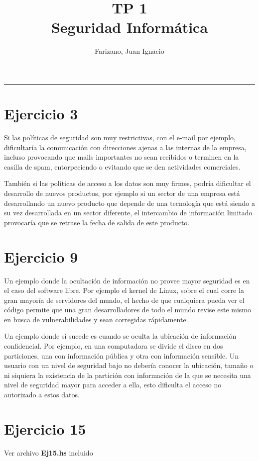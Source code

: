 \documentclass[11pt]{article}
\title{
    TP 1 \\
    \large Seguridad Informática}
\author{Farizano, Juan Ignacio}
\date{}
\begin{document}
\maketitle

\rule{\textwidth}{1pt}

\section*{Ejercicio 3}
Si las políticas de seguridad son muy restrictivas, con el e-mail por ejemplo, dificultaría
la comunicación con direcciones ajenas a las internas de la empresa, incluso provocando
que mails importantes no sean recibidos o terminen en la casilla de spam,
entorpeciendo o evitando que se den actividades comerciales.

También si las politicas de acceso a los datos son muy firmes, podría dificultar
el desarrollo de nuevos productos, por ejemplo si un sector de una empresa está
desarrollando un nuevo producto que depende de una tecnología que está siendo 
a su vez desarrollada en un sector diferente, el intercambio de información limitado
provocaría que se retrase la fecha de salida de este producto.


\section*{Ejercicio 9}
Un ejemplo donde la ocultación de información no provee mayor seguridad es en el 
caso del software libre. Por ejemplo el kernel de Linux, sobre el cual corre la gran
mayoría de servidores del mundo, el hecho de que cualquiera pueda ver el código
permite que una gran desarrolladores de todo el mundo revise este mismo en busca
de vulnerabilidades y sean corregidas rápidamente.

Un ejemplo donde sí sucede es cuando se oculta la ubicación de información
confidencial. Por ejemplo, en una computadora se divide el disco en dos particiones,
una con información pública y otra con información sensible. Un usuario con un 
nivel de seguridad bajo no debería conocer la ubicación, tamaño o ni siquiera la
existencia de la partición con información de la que se necesita una nivel de seguridad
mayor para acceder a ella, esto dificulta el acceso no autorizado a estos datos.

\section*{Ejercicio 15}
Ver archivo \textbf{Ej15.hs} incluido
\end{document}
